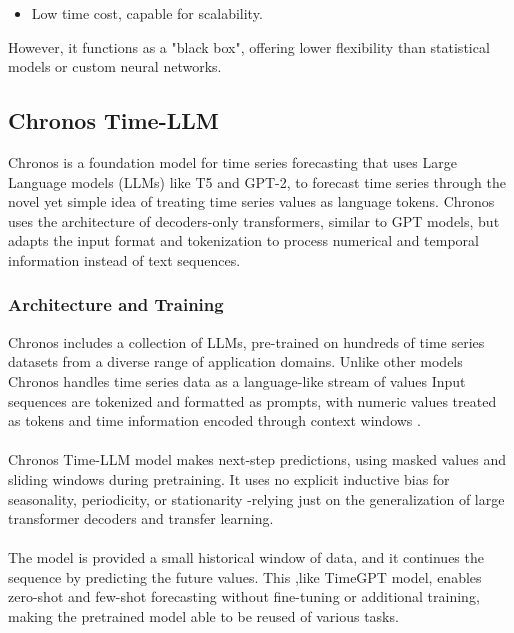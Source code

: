\documentclass{article}
\begin{document}
\begin{itemize}
    \item Low time cost, capable for scalability.
\end{itemize}

However, it functions as a "black box", offering lower flexibility than statistical models or custom neural networks.


\subsection{Chronos Time-LLM}
Chronos is a foundation model for time series forecasting that uses Large Language models (LLMs) like T5 and GPT-2, to forecast time series through the novel yet simple idea of treating time series values as language tokens. Chronos uses the architecture of decoders-only transformers, similar to GPT models, but adapts the input format and  tokenization to process numerical and temporal information instead of text sequences.

\subsubsection{Architecture and Training}
Chronos includes a collection of LLMs, pre-trained on hundreds of time series datasets from a diverse range of application domains. Unlike other models Chronos handles time series data as a language-like stream of values Input sequences are tokenized and formatted as prompts, with numeric values treated as tokens and time information encoded through context windows \cite{ansari2024chronos}.\\
\\
Chronos Time-LLM model makes next-step predictions, using masked values and sliding windows during pretraining. It uses no explicit inductive bias for seasonality, periodicity, or stationarity -relying just on the generalization of large transformer decoders and transfer learning.\\
\\
The model is provided a small historical window of data, and it continues the sequence by predicting the future values. This ,like TimeGPT model, enables zero-shot and few-shot forecasting without fine-tuning or additional training, making the pretrained model able to be reused of various tasks.
\end{document}
